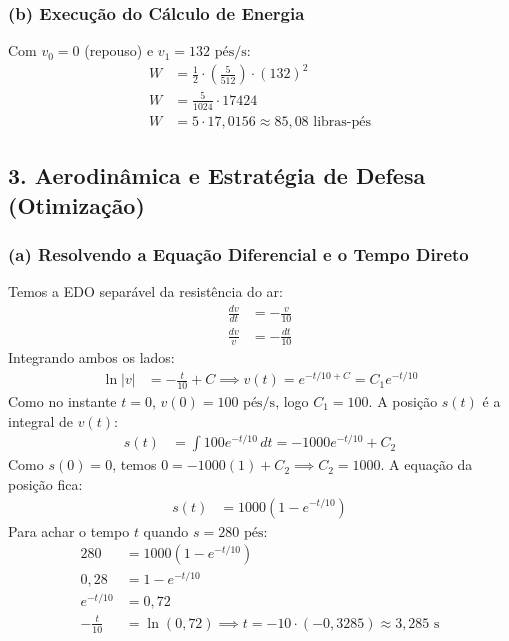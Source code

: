 \documentclass[12pt,a4paper]{article}
\begin{document}
\subsubsection*{(b) Execução do Cálculo de Energia}
Com $v_0 = 0$ (repouso) e $v_1 = 132\text{ pés/s}$:
\begin{align*}
    W &= \frac{1}{2} \cdot \left(\frac{5}{512}\right) \cdot (132)^2 \\
    W &= \frac{5}{1024} \cdot 17424 \\
    W &= 5 \cdot 17{,}0156 \approx 85{,}08\text{ libras-pés}
\end{align*}

\subsection{3. Aerodinâmica e Estratégia de Defesa (Otimização)}

\subsubsection*{(a) Resolvendo a Equação Diferencial e o Tempo Direto}
Temos a EDO separável da resistência do ar:
\begin{align*}
    \frac{dv}{dt} &= -\frac{v}{10} \\
    \frac{dv}{v} &= -\frac{dt}{10}
\end{align*}
Integrando ambos os lados:
\begin{align*}
    \ln|v| &= -\frac{t}{10} + C \implies v(t) = e^{-t/10 + C} = C_1 e^{-t/10}
\end{align*}
Como no instante $t=0$, $v(0) = 100\text{ pés/s}$, logo $C_1 = 100$.
A posição $s(t)$ é a integral de $v(t)$:
\begin{align*}
    s(t) &= \int 100 e^{-t/10} \, dt = -1000 e^{-t/10} + C_2
\end{align*}
Como $s(0) = 0$, temos $0 = -1000(1) + C_2 \implies C_2 = 1000$. A equação da posição fica:
\begin{align*}
    s(t) &= 1000(1 - e^{-t/10})
\end{align*}
Para achar o tempo $t$ quando $s = 280\text{ pés}$:
\begin{align*}
    280 &= 1000(1 - e^{-t/10}) \\
    0{,}28 &= 1 - e^{-t/10} \\
    e^{-t/10} &= 0{,}72 \\
    -\frac{t}{10} &= \ln(0{,}72) \implies t = -10 \cdot (-0{,}3285) \approx 3{,}285\text{ s}
\end{align*}
\end{document}
